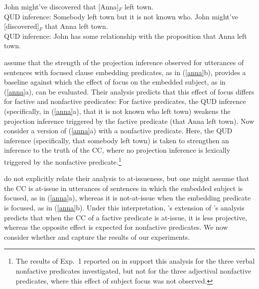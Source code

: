 \documentclass[11pt,fleqn]{article}
\newcommand{\6}{\mbox{$[\hspace*{-.6mm}[$}}
\newcommand{\9}{\mbox{$]\hspace*{-.6mm}]$}}
\newcommand{\citepos}[1]{\citeauthor{#1}'s \citeyear{#1}}
\begin{document}
\begin{exe}
\ex\label{anna} \citealt[73]{djaerv-bacovcin2020}
\begin{xlist}
\ex John might've discovered that [Anna]$_F$ left town. \\ QUD inference: Somebody left town but it is not known who.
\ex John might've [discovered]$_F$ that Anna left town.  \\ QUD inference: John has some relationship with the proposition that Anna left town.
\end{xlist}
\end{exe}
\citealt{djaerv-bacovcin2020} assume that the strength of the projection inference observed for utterances of sentences with focused clause embedding predicates, as in (\ref{anna}b), provides a baseline against which the effect of focus on the embedded subject, as in (\ref{anna}a), can be evaluated. Their analysis predicts that this effect of focus differs for factive and nonfactive predicates: For factive predicates, the QUD inference (specifically, in (\ref{anna}a), that it is not known who left town) weakens the projection inference triggered by the factive predicate (that Anna left town). Now consider a version of (\ref{anna}a) with a nonfactive predicate. Here, the QUD inference (specifically, that somebody left town) is taken to strengthen an inference to the truth of the CC, where no projection inference is lexically triggered by the nonfactive predicate.\footnote{The results of Exp.~1 reported on in \citealt{djaerv-bacovcin2020} support this analysis for the three verbal nonfactive predicates investigated, but not for the three adjectival nonfactive predicates, where this effect of subject focus was not observed.}

\citealt{djaerv-bacovcin2020} do not explicitly relate their analysis to at-issueness, but one might assume that the CC is at-issue in utterances of sentences in which the embedded subject is focused, as in (\ref{anna}a), whereas it is not-at-issue when the embedding predicate is focused, as in (\ref{anna}b). Under this interpretation,  \citepos{djaerv-bacovcin2020} extension of \citepos{heim83} analysis predicts that when the CC of a factive predicate is at-issue, it is less projective, whereas the opposite effect is expected for nonfactive predicates. We now consider whether \citealt{heim83} and \citealt{djaerv-bacovcin2020} capture the results of our experiments. 
\end{document}

